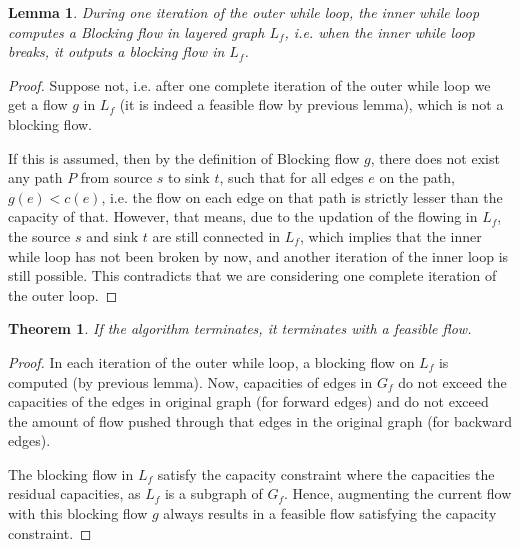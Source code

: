 \documentclass[12pt]{article}
\newtheorem{theorem}{Theorem}[section]
\newtheorem{lemma}{Lemma}[section]
\begin{document}
\begin{lemma}
	During one iteration of the outer while loop, the inner while loop computes a Blocking flow in layered graph $L_f$, i.e. when the inner while loop breaks, it outputs a blocking flow in $L_f$.
\end{lemma}
\begin{proof}
	Suppose not, i.e. after one complete iteration of the outer while loop we get a flow $g$ in $L_f$ (it is indeed a feasible flow by previous lemma), which is not a blocking flow.\par 
	If this is assumed, then by the definition of Blocking flow $g$, there does not exist any path $P$ from source $s$ to sink $t$, such that for all edges $e$ on the path, $g(e) < c(e)$, i.e. the flow on each edge on that path is strictly lesser than the capacity of that. However, that means, due to the updation of the flowing in $L_f$, the source $s$ and sink $t$ are still connected in $L_f$, which implies that the inner while loop has not been broken by now, and another iteration of the inner loop is still possible. This contradicts that we are considering one complete iteration of the outer loop.
\end{proof}

\begin{theorem}
	If the algorithm terminates, it terminates with a feasible flow.
\end{theorem}
\begin{proof}
	In each iteration of the outer while loop, a blocking flow on $L_f$ is computed (by previous lemma). Now, capacities of edges in $G_f$ do not exceed the capacities of the edges in original graph (for forward edges) and do not exceed the amount of flow pushed through that edges in the original graph (for backward edges).\par 
	The blocking flow in $L_f$ satisfy the capacity constraint where the capacities the residual capacities, as $L_f$ is a subgraph of $G_f$. Hence, augmenting the current flow with this blocking flow $g$ always results in a feasible flow satisfying the capacity constraint.   
\end{proof}
\end{document}
